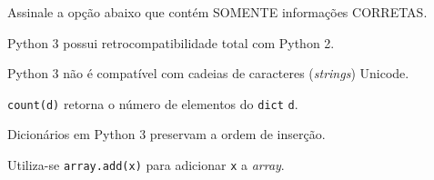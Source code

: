 {%
\item \rtask \ponto{\pt} 
Assinale a opção abaixo que contém SOMENTE informações CORRETAS.

\begin{answerlist}[label={\texttt{\Alph*}.},leftmargin=*]
    \ti Python 3 possui retrocompatibilidade total com Python 2.
    
    \ti Python 3 não é compatível com cadeias de caracteres (\textit{strings}) Unicode.
    
    \ti \lstinline[style=Python]|count(d)| retorna o número de elementos do \lstinline[style=Python]|dict| \lstinline[style=Python]|d|.
    
    \di Dicionários em Python 3 preservam a ordem de inserção.
    
    \ti Utiliza-se \lstinline[style=Python]|array.add(x)| para adicionar \lstinline[style=Python]|x| a \textit{array}.
\end{answerlist}
}
